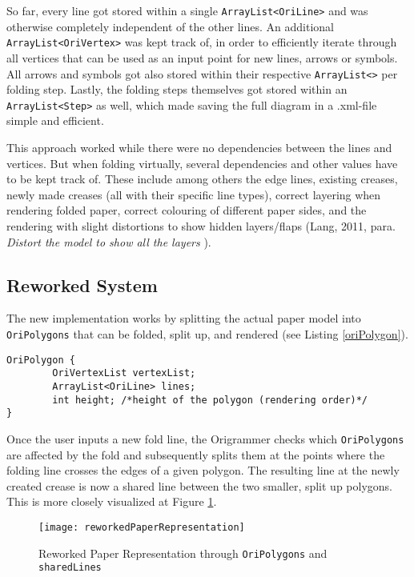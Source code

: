 So far, every line got stored within a single \texttt{ArrayList<OriLine>} and was otherwise completely independent of the other lines. An additional\\
\texttt{ArrayList<OriVertex>} was kept track of, in order to efficiently iterate through all vertices that can be used as an input point for new lines, arrows or symbols. All arrows and symbols got also stored within their respective \texttt{ArrayList<>} per folding step. Lastly, the folding steps themselves got stored within an \texttt{ArrayList<Step>} as well, which made saving the full diagram in a .xml-file simple and efficient.

This approach worked while there were no dependencies between the lines and vertices. But when folding virtually, several dependencies and other values have to be kept track of. These include among others the edge lines, existing creases, newly made creases (all with their specific line types), correct layering when rendering folded paper, correct colouring of different paper sides, and the rendering with slight distortions to show hidden layers/flaps (Lang, 2011, para.  \emph{Distort the model to show all the layers} \cite{Lang}).

\subsection{Reworked System}

The new implementation works by splitting the actual paper model into \texttt{OriPolygons} that can be folded, split up, and rendered (see Listing \ref{oriPolygon}).
\begin{lstlisting}[label=oriPolygon,caption=OriPolygon]
OriPolygon {
        OriVertexList vertexList; 
        ArrayList<OriLine> lines;
        int height; /*height of the polygon (rendering order)*/
}
\end{lstlisting}

\noindent Once the user inputs a new fold line, the Origrammer checks which \texttt{OriPolygons} are affected by the fold and subsequently splits them at the points where the folding line crosses the edges of a given polygon. The resulting line at the newly created crease is now a shared line between the two smaller, split up polygons. This is more closely visualized at Figure \ref{fig:reworkedPaperRepresentation}.
 \begin{figure}[htbp]
	\centering
	\texttt{[image: reworkedPaperRepresentation]}
	\caption{Reworked Paper Representation through \texttt{OriPolygons} and \texttt{sharedLines}}
	\label{fig:reworkedPaperRepresentation}
\end{figure}

